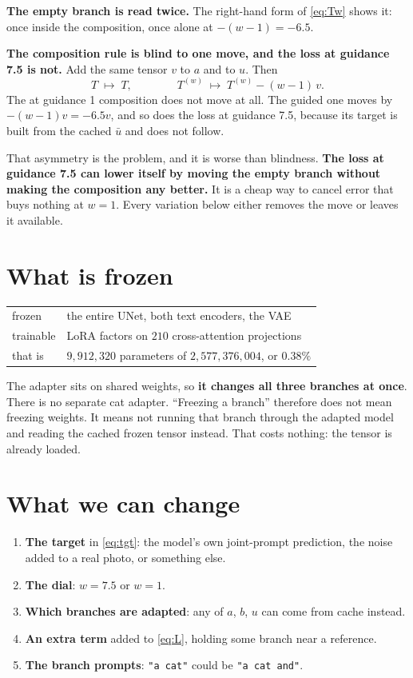 \documentclass[11pt]{article}
\newcommand{\B}[1]{\textbf{#1}}
\begin{document}
\B{The empty branch is read twice.} The right-hand form of \eqref{eq:Tw} shows it: once inside the
composition, once alone at $-(w-1) = -6.5$.

\B{The composition rule is blind to one move, and the loss at guidance 7.5 is not.}
Add the same tensor $v$ to $a$ and to $u$. Then
\begin{equation}
  T \;\mapsto\; T, \qquad\qquad
  T^{(w)} \;\mapsto\; T^{(w)} - (w-1)\,v .
  \label{eq:gauge}
\end{equation}
The at guidance 1 composition does not move at all. The guided one moves by $-(w-1)v = -6.5v$, and
so does the loss at guidance 7.5, because its target is built from the cached $\bar u$ and does not follow.

That asymmetry is the problem, and it is worse than blindness. \textbf{The loss at guidance 7.5 can lower
itself by moving the empty branch without making the composition any better.} It is a cheap way to
cancel error that buys nothing at $w=1$. Every variation below either removes the move or leaves
it available.

\section{What is frozen}

\begin{center}
\small
\begin{tabular}{ll}
\toprule
frozen & the entire UNet, both text encoders, the VAE \\
trainable & LoRA factors on $210$ cross-attention projections \\
that is & $9{,}912{,}320$ parameters of $2{,}577{,}376{,}004$, or $0.38\%$ \\
\bottomrule
\end{tabular}
\end{center}

The adapter sits on shared weights, so \B{it changes all three branches at once}. There is no
separate cat adapter. ``Freezing a branch'' therefore does not mean freezing weights. It means not
running that branch through the adapted model and reading the cached frozen tensor instead. That
costs nothing: the tensor is already loaded.

\section{What we can change}

\begin{enumerate}
\item \B{The target} in \eqref{eq:tgt}: the model's own joint-prompt prediction, the noise added to
  a real photo, or something else.
\item \B{The dial}: $w = 7.5$ or $w = 1$.
\item \B{Which branches are adapted}: any of $a$, $b$, $u$ can come from cache instead.
\item \B{An extra term} added to \eqref{eq:L}, holding some branch near a reference.
\item \B{The branch prompts}: \texttt{"a cat"} could be \texttt{"a cat and"}.
\end{enumerate}
\end{document}
